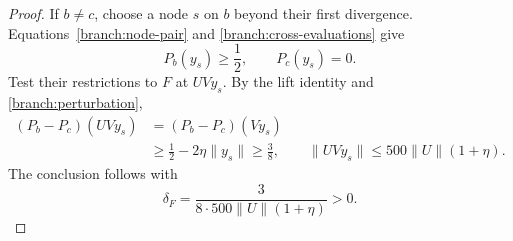 \begin{proof}
If $b\ne c$, choose a node $s$ on $b$ beyond their first divergence.
Equations~\eqref{branch:node-pair} and
\eqref{branch:cross-evaluations} give
\[
                       P_b(y_s)\geq\frac12,
                       \qquad P_c(y_s)=0.
\]
Test their restrictions to $F$ at $UVy_s$.  By the lift identity and
\eqref{branch:perturbation},
\begin{align*}
 (P_b-P_c)(UVy_s)
   &=(P_b-P_c)(Vy_s)\\
   &\geq\frac12-2\eta\|y_s\|
    \geq\frac38,
 \qquad
 \|UVy_s\|\leq500\|U\|(1+\eta).
\end{align*}
The conclusion follows with
\[
                \delta_F=\frac{3}{8\cdot500\|U\|(1+\eta)}>0.
\]
\end{proof}
